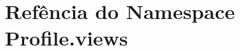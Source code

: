 \hypertarget{namespaceProfile_1_1views}{\section{Refência do Namespace Profile.\-views}
\label{de/d92/namespaceProfile_1_1views}
}
